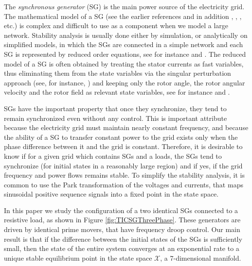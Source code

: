 \documentclass[letterpaper, 10 pt, conference]{ieeeconf}
\newcommand{\Xmscr}  {{\mathcal{X}}}
\begin{document}
The {\em synchronous generator} (SG) is the main power source of the
electricity grid. The mathematical model of a SG (see the earlier
references and in addition \cite{Walker:94}, \cite{Fitzgerald:03},
\cite{MaWe:15}, etc.) is complex and difficult to use as a component
when we model a large network. Stability analysis is usually done
either by simulation, or analytically on simplified models, in which
the SGs are connected in a simple network and each SG is represented
by reduced order equations, see for instance \cite{DoBull:12} and
\cite{PoDoBu:13}. The reduced model of a SG is often obtained by
treating the stator currents as fast variables, thus eliminating them
from the state variables via the singular perturbation approach (see,
for instance, \cite{Khalil}) and keeping only the rotor angle, the
rotor angular velocity and the rotor field as relevant state
variables, see for instance \cite{Kundur} and \cite{SauerPai1998}.

SGs have the important property that once they synchronize, they tend
to remain synchronized even without any control. This is important
attribute because the electricity grid must maintain nearly constant
frequency, and because the ability of a SG to transfer constant power
to the grid exists only when the phase difference between it and the
grid is constant. Therefore, it is desirable to know if for a given
grid which contains SGs and a loads, the SGs tend to synchronize (for
initial states in a reasonably large region) and if yes, if the grid
frequency and power flows remains stable. To simplify the stability
analysis, it is common to use the Park transformation of the voltages
and currents, that maps sinusoidal positive sequence signals into a
fixed point in the state space.

In this paper we study the configuration of a two identical SGs
connected to a resistive load, as shown in Figure
\ref{fig:TICSGThreePhase}. These generators are driven by identical
prime movers, that have frequency droop control. Our main result is
that if the difference between the initial states of the SGs is
sufficiently small, then the state of the entire system converges at
an exponential rate to a unique stable equilibrium point in the state
space $\Xmscr$, a 7-dimensional manifold.
\end{document}
